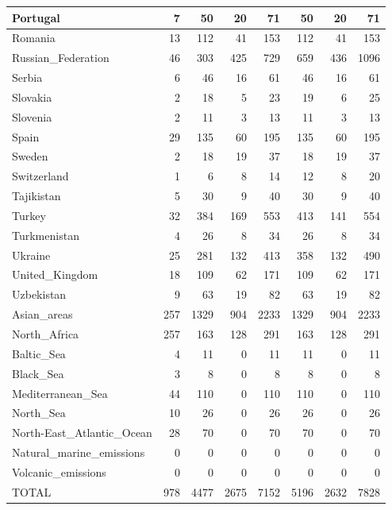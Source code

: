 \begin{table}
\begin{center}
\begin{tabular}{|l|r|r|r|r||r|r|r|}
                      Portugal&     7&    50&    20&    71&    50&    20&    71 \\\hline
                       Romania&    13&   112&    41&   153&   112&    41&   153 \\\hline
            Russian_Federation&    46&   303&   425&   729&   659&   436&  1096 \\\hline
                        Serbia&     6&    46&    16&    61&    46&    16&    61 \\\hline
                      Slovakia&     2&    18&     5&    23&    19&     6&    25 \\\hline
                      Slovenia&     2&    11&     3&    13&    11&     3&    13 \\\hline
                         Spain&    29&   135&    60&   195&   135&    60&   195 \\\hline
                        Sweden&     2&    18&    19&    37&    18&    19&    37 \\\hline
                   Switzerland&     1&     6&     8&    14&    12&     8&    20 \\\hline
                    Tajikistan&     5&    30&     9&    40&    30&     9&    40 \\\hline
                        Turkey&    32&   384&   169&   553&   413&   141&   554 \\\hline
                  Turkmenistan&     4&    26&     8&    34&    26&     8&    34 \\\hline
                       Ukraine&    25&   281&   132&   413&   358&   132&   490 \\\hline
                United_Kingdom&    18&   109&    62&   171&   109&    62&   171 \\\hline
                    Uzbekistan&     9&    63&    19&    82&    63&    19&    82 \\\hline
                   Asian_areas&   257&  1329&   904&  2233&  1329&   904&  2233 \\\hline
                  North_Africa&   257&   163&   128&   291&   163&   128&   291 \\\hline
                    Baltic_Sea&     4&    11&     0&    11&    11&     0&    11 \\\hline
                     Black_Sea&     3&     8&     0&     8&     8&     0&     8 \\\hline
             Mediterranean_Sea&    44&   110&     0&   110&   110&     0&   110 \\\hline
                     North_Sea&    10&    26&     0&    26&    26&     0&    26 \\\hline
     North-East_Atlantic_Ocean&    28&    70&     0&    70&    70&     0&    70 \\\hline
      Natural_marine_emissions&     0&     0&     0&     0&     0&     0&     0 \\\hline
            Volcanic_emissions&     0&     0&     0&     0&     0&     0&     0 \\\hline\hline
                         TOTAL&   978&  4477&  2675&  7152&  5196&  2632&  7828 \\\hline 



\end{tabular}
\end{center}
\end{table}
